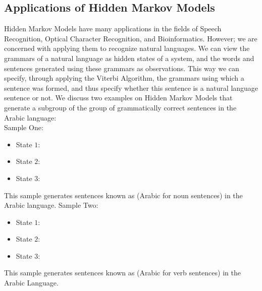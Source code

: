 \documentclass{acm_proc_article-sp}
\begin{document}
\subsection{Applications of Hidden Markov Models}\label{Applications-of-Hidden-Markov-Models}
Hidden Markov Models have many applications in the fields of Speech Recognition, Optical Character Recognition, and Bioinformatics. However; we are concerned with applying them to recognize natural languages. We can view the grammars of a natural language as hidden states of a system, and the words and sentences generated using these grammars as observations. This way we can specify, through applying the Viterbi Algorithm, the grammars using which a sentence was formed, and thus specify whether this sentence is a natural language sentence or not. We discuss two examples on Hidden Markov Models that generate a subgroup of the group of grammatically correct sentences in the Arabic language:\\
Sample One:
\begin{itemize}
    \item State $1$: 
    \item State $2$: 
    \item State $3$: 
\end{itemize}
This sample generates sentences known as  (Arabic for noun sentences) in the Arabic language.
Sample Two:\\
\begin{itemize}
    \item State $1$: 
    \item State $2$: 
    \item State $3$: 
\end{itemize}
This sample generates sentences known as  (Arabic for verb sentences) in the Arabic Language.
\end{document}
